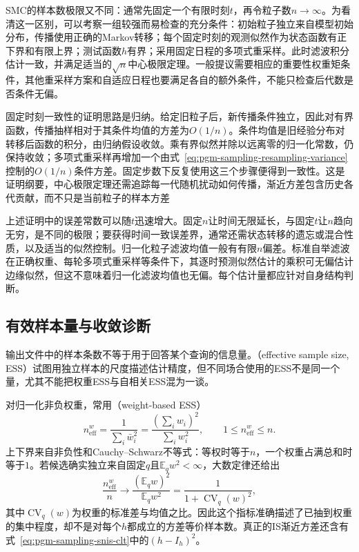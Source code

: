 SMC的样本数极限又不同：通常先固定一个有限时刻$t$，再令粒子数$n\to\infty$。为看清这一区别，可以考察一组较强而易检查的充分条件：初始粒子独立来自模型初始分布，传播使用正确的Markov转移；每个固定时刻的观测似然作为状态函数有正下界和有限上界；测试函数$h$有界；采用固定日程的多项式重采样。此时滤波积分估计一致，并满足适当的$\sqrt n$中心极限定理。一般提议需要相应的重要性权重矩条件，其他重采样方案和自适应日程也要满足各自的额外条件，不能只检查后代数是否条件无偏。

固定时刻一致性的证明思路是归纳。给定旧粒子后，新传播条件独立，因此对有界函数，传播抽样相对于其条件均值的方差为$O(1/n)$。条件均值是旧经验分布对转移后函数的积分，由归纳假设收敛。乘有界似然并除以远离零的归一化常数，仍保持收敛；多项式重采样再增加一个由式~\eqref{eq:pgm-sampling-resampling-variance}控制的$O(1/n)$条件方差。固定步数下反复使用这三个步骤便得到一致性。这是证明纲要，中心极限定理还需追踪每一代随机扰动如何传播，渐近方差包含历史各代贡献，而不只是当前粒子的样本方差

上述证明中的误差常数可以随$t$迅速增大。固定$n$让时间无限延长，与固定$t$让$n$趋向无穷，是不同的极限；要获得时间一致误差界，通常还需状态转移的遗忘或混合性质，以及适当的似然控制。归一化粒子滤波均值一般有有限$n$偏差。标准自举滤波在正确权重、每轮多项式重采样等条件下，其逐时预测似然估计的乘积可无偏估计边缘似然，但这不意味着归一化滤波均值也无偏。每个估计量都应针对自身结构判断。

\subsection{有效样本量与收敛诊断}
\label{sec:pgm-sampling-diagnostics}

输出文件中的样本条数不等于用于回答某个查询的信息量。（effective sample size, ESS）试图用独立样本的尺度描述估计精度，但不同场合使用的ESS不是同一个量，尤其不能把权重ESS与自相关ESS混为一谈。

对归一化非负权重，常用（weight-based ESS）
\begin{equation}
  n_{\mathrm{eff}}^{w}
    =\frac{1}{\sum_i\bar w_i^2}
    =\frac{(\sum_i w_i)^2}{\sum_i w_i^2},
  \qquad 1\leq n_{\mathrm{eff}}^{w}\leq n.
  \label{eq:pgm-sampling-weight-ess}
\end{equation}
上下界来自非负性和Cauchy--Schwarz不等式：等权时等于$n$，一个权重占满总和时等于$1$。若候选确实独立来自固定$q$且$\mathbb{E}_q w^2<\infty$，大数定律还给出
\[
  \frac{n_{\mathrm{eff}}^{w}}{n}
    \longrightarrow
    \frac{(\mathbb{E}_q w)^2}{\mathbb{E}_q w^2}
    =\frac{1}{1+\operatorname{CV}_q(w)^2},
\]
其中$\operatorname{CV}_q(w)$为权重的标准差与均值之比。因此这个指标准确描述了已抽到权重的集中程度，却不是对每个$h$都成立的方差等价样本数。真正的IS渐近方差还含有式~\eqref{eq:pgm-sampling-snis-clt}中的$(h-I_h)^2$。

